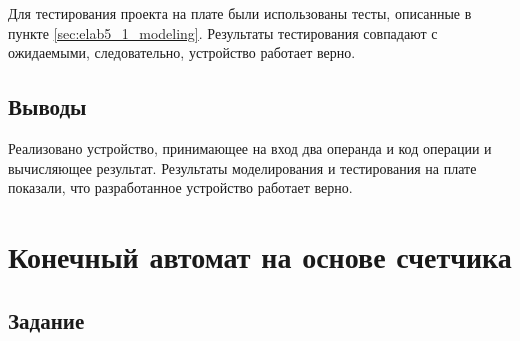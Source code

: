 Для тестирования проекта на плате были использованы тесты, описанные в пункте \ref{sec:elab5_1_modeling}. Результаты тестирования совпадают с ожидаемыми, следовательно, устройство работает верно.

\subsection{Выводы}

Реализовано устройство, принимающее на вход два операнда и код операции и вычисляющее результат. Результаты моделирования и тестирования на плате показали, что разработанное устройство работает верно.

\newpage

\section{Конечный автомат на основе счетчика}

\subsection{Задание}

